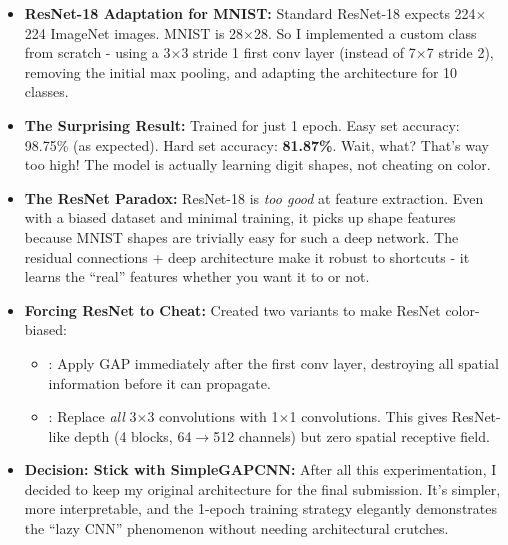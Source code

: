 \documentclass[9pt,a4paper,twocolumn,twoside]{tau-class/tau}
\begin{document}
        \begin{itemize}
            \item \textbf{ResNet-18 Adaptation for MNIST:} Standard ResNet-18 expects 224$\times$224 ImageNet images. MNIST is 28$\times$28. So I implemented a custom  class from scratch \cite{gfg_resnet} - using a 3$\times$3 stride 1 first conv layer (instead of 7$\times$7 stride 2), removing the initial max pooling, and adapting the architecture for 10 classes.

            \item \textbf{The Surprising Result:} Trained for just 1 epoch. Easy set accuracy: 98.75\% (as expected). Hard set accuracy: \textbf{81.87\%}. Wait, what? That's way too high! The model is actually learning digit shapes, not cheating on color.

            \item \textbf{The ResNet Paradox:} ResNet-18 is \textit{too good} at feature extraction. Even with a biased dataset and minimal training, it picks up shape features because MNIST shapes are trivially easy for such a deep network. The residual connections + deep architecture make it robust to shortcuts - it learns the ``real'' features whether you want it to or not.

            \item \textbf{Forcing ResNet to Cheat:} Created two variants to make ResNet color-biased:
            \begin{itemize}
                \item {}: Apply GAP immediately after the first conv layer, destroying all spatial information before it can propagate.
                \item {}: Replace \textit{all} 3$\times$3 convolutions with 1$\times$1 convolutions. This gives ResNet-like depth (4 blocks, 64$\rightarrow$512 channels) but zero spatial receptive field.
            \end{itemize}

            \item \textbf{Decision: Stick with SimpleGAPCNN:} After all this experimentation, I decided to keep my original  architecture for the final submission. It's simpler, more interpretable, and the 1-epoch training strategy elegantly demonstrates the ``lazy CNN'' phenomenon without needing architectural crutches.
        \end{itemize}
\end{document}
